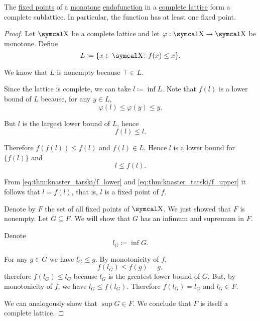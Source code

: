 \begin{proposition}\label{thm:knaster_tarski_theorem}
  The \hyperref[def:fixed_point]{fixed points} of a \hyperref[def:monotone_map]{monotone} \hyperref[def:endofunction]{endofunction} in a \hyperref[def:lattice]{complete lattice} form a complete sublattice. In particular, the function has at least one fixed point.
\end{proposition}
\begin{proof}
  Let \( \CX \) be a complete lattice and let \( \varphi: \CX \to \CX \) be monotone. Define
  \begin{equation*}
    L \coloneqq \{ x \in \CX \colon f(x) \leq x \}.
  \end{equation*}

  We know that \( L \) is nonempty because \( \top \in L \).

  Since the lattice is complete, we can take \( l \coloneqq \inf L \). Note that \( f(l) \) is a lower bound of \( L \) because, for any \( y \in L \),
  \begin{equation*}
    \varphi(l) \leq \varphi(y) \leq y.
  \end{equation*}

  But \( l \) is the largest lower bound of \( L \), hence
  \begin{equation}\label{eq:thm:knaster_tarski/f_lower}
    f(l) \leq l.
  \end{equation}

  Therefore \( f(f(l)) \leq f(l) \) and \( f(l) \in L \). Hence \( l \) is a lower bound for \( \{ f(l) \} \) and
  \begin{equation}\label{eq:thm:knaster_tarski/f_upper}
    l \leq f(l).
  \end{equation}

  From \eqref{eq:thm:knaster_tarski/f_lower} and \eqref{eq:thm:knaster_tarski/f_upper} it follows that \( l = f(l) \), that is, \( l \) is a fixed point of \( f \).

  Denote by \( F \) the set of all fixed points of \( \CX \). We just showed that \( F \) is nonempty. Let \( G \subseteq F \). We will show that \( G \) has an infimum and supremum in \( F \).

  Denote
  \begin{equation*}
    l_G \coloneqq \inf G.
  \end{equation*}

  For any \( g \in G \) we have \( l_G \leq g \). By monotonicity of \( f \),
  \begin{equation*}
    f(l_G) \leq f(g) = g,
  \end{equation*}
  therefore \( f(l_G) \leq l_G \) because \( l_G \) is the greatest lower bound of \( G \). But, by monotonicity of \( f \), we have \( l_G \leq f(l_G) \). Therefore \( f(l_G) = l_G \) and \( l_G \in F \).

  We can analogously show that \( \sup G \in F \). We conclude that \( F \) is itself a complete lattice.
\end{proof}

